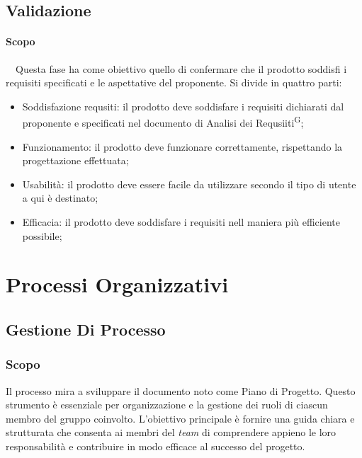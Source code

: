 \documentclass[5pt]{article}
\begin{document}
	\subsection{Validazione}
   
   \paragraph{Scopo}~\
   Questa fase ha come obiettivo quello di confermare che il prodotto soddisfi i requisiti specificati e le aspettative del proponente.
	Si divide in quattro parti:
	\begin{itemize}
		\item Soddisfazione requsiti: il prodotto deve soddisfare i requisiti dichiarati dal proponente e specificati nel documento di Analisi dei Requsiiti\textsuperscript{G};
		\item Funzionamento: il prodotto deve funzionare correttamente, rispettando la progettazione effettuata;
		\item Usabilità: il prodotto deve essere facile da utilizzare secondo il tipo di utente a qui è destinato;
		\item Efficacia: il prodotto deve soddisfare i requisiti nell maniera più efficiente possibile; 
	\end{itemize}

\section{Processi Organizzativi}
\subsection{Gestione Di Processo}

\subsubsection{Scopo}
Il processo mira a sviluppare il documento noto come Piano di Progetto. Questo strumento è essenziale per organizzazione e la gestione dei ruoli di ciascun membro del gruppo coinvolto. L'obiettivo principale è fornire una guida chiara e strutturata che consenta ai membri del \textit{team} di comprendere appieno le loro responsabilità e contribuire in modo efficace al successo del progetto.
\end{document}
